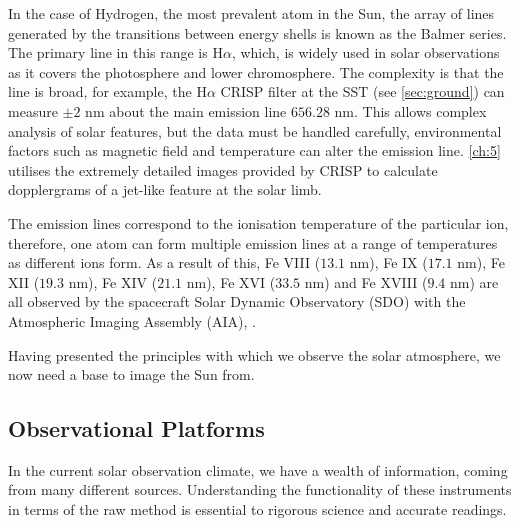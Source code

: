 In the case of Hydrogen, the most prevalent atom in the Sun, the array of lines generated by the transitions between energy shells is known as the Balmer series.
The primary line in this range is H$\alpha$, which, is widely used in solar observations as it covers the photosphere and lower chromosphere.
The complexity is that the line is broad, for example, the H$\alpha$ CRISP filter at the SST (see \cref{sec:ground}) can measure $\pm 2$ nm about the main emission line $656.28$ nm.
This allows complex analysis of solar features, but the data must be handled carefully, environmental factors such as magnetic field and temperature can alter the emission line.
\cref{ch:5} utilises the extremely detailed images provided by CRISP to calculate dopplergrams of a jet-like feature at the solar limb.




The emission lines correspond to the ionisation temperature of the particular ion, therefore, one atom can form multiple emission lines at a range of temperatures as different ions form.
As a result of this, Fe VIII ($13.1$ nm), Fe IX ($17.1$ nm), Fe XII ($19.3$ nm), Fe XIV ($21.1$ nm), Fe XVI ($33.5$ nm) and Fe XVIII ($9.4$ nm) are all observed by the spacecraft Solar Dynamic Observatory (SDO) with the Atmospheric Imaging Assembly (AIA), \cite{Schmelz2013}.


Having presented the principles with which we observe the solar atmosphere, we now need a base to image the Sun from.

\subsection{Observational Platforms }

In the current solar observation climate, we have a wealth of information, coming from many different sources.
Understanding the functionality of these instruments in terms of the raw method is essential to rigorous science and accurate readings.

